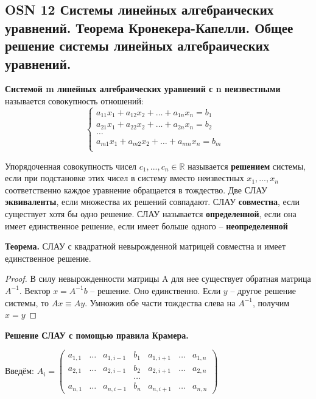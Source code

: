 \subsection{OSN 12 Системы линейных алгебраических уравнений. Теорема Кронекера-Капелли. Общее решение системы линейных алгебраических уравнений.}

\textbf{Системой m линейных алгебраических уравнений с n неизвестными} называется совокупность отношений:
    $$\begin{cases}
        a_{11}x_1 + a_{12}x_2+\dots+a_{1n}x_n = b_1&\\
        a_{21}x_1 + a_{22}x_2+\dots+a_{2n}x_n = b_2&\\
        \dots&\\
        a_{m1}x_1 + a_{m2}x_2+\dots+a_{mn}x_n = b_m&\\
    \end{cases}$$
    
Упорядоченная совокупность чисел $c_1, ..., c_n \in\mathbb{R}$ называется \textbf{решением} системы, если при подстановке этих чисел в систему вместо неизвестных $x_1, ..., x_n$ соответственно каждое уравнение обращается в тождество.
Две СЛАУ \textbf{эквиваленты}, если множества их решений совпадают.
СЛАУ \textbf{совместна}, если существует хотя бы одно решение.
СЛАУ называется \textbf{определенной}, если она имеет единственное решение, если имеет больше одного -- \textbf{неопределенной}


\textbf{Теорема.} СЛАУ с квадратной невырожденной матрицей совместна и имеет единственное решение.

\begin{proof}
В силу невырожденности матрицы A для нее существует обратная матрица $A^{-1}$.
Вектор $x = A^{-1}b$ -- решение. Оно единственно. Если $y$ -- другое решение системы, то $Ax \equiv Ay$. Умножив обе части тождества слева на $A^{-1}$, получим $x = y$
\end{proof}

\textbf{Решение СЛАУ с помощью правила Крамера.}

Введём:
$A_i = \begin{pmatrix} a_{1,1} & \dots & a_{1,i-1} & b_1 & a_{1,i+1} & \dots & a_{1,n} \\
           a_{2,1} & \dots & a_{2,i-1} & b_2 & a_{2,i+1} & \dots & a_{2,n} \\
            & & & \dots & & & \\
           a_{n,1} & \dots & a_{n,i-1} & b_n & a_{n,i+1} & \dots & a_{n,n}
\end{pmatrix}$

